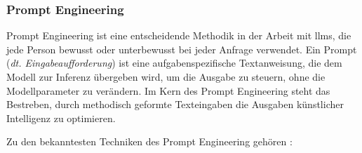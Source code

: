 \subsubsection{Prompt Engineering} \label{sec:llm_prompt_engineering}

Prompt Engineering ist eine entscheidende Methodik in der Arbeit mit \acp{llm}, die jede Person bewusst oder unterbewusst bei jeder Anfrage verwendet. Ein Prompt (\textit{dt. Eingabeaufforderung}) ist eine aufgabenspezifische Textanweisung, die dem Modell zur Inferenz übergeben wird, um die Ausgabe zu steuern, ohne die Modellparameter zu verändern. Im Kern des Prompt Engineering steht das Bestreben, durch methodisch geformte Texteingaben die Ausgaben künstlicher Intelligenz zu optimieren. \cite{prompt-survey}

Zu den bekanntesten Techniken des Prompt Engineering gehören \cite{prompt-survey}:
